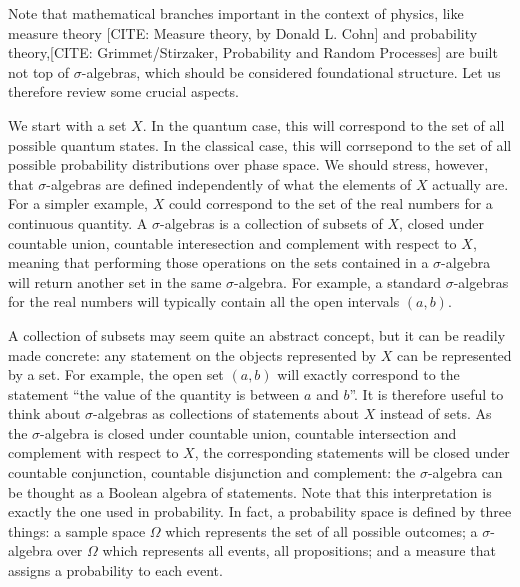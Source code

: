\documentclass[11pt, executivepaper]{article}
\begin{document}


Note that mathematical branches important in the context of physics, like measure theory [CITE: Measure theory, by Donald L. Cohn] and probability theory,[CITE: Grimmet/Stirzaker, Probability and Random Processes] are built not top of $\sigma$-algebras, which should be considered foundational structure. Let us therefore review some crucial aspects.

We start with a set $X$. In the quantum case, this will correspond to the set of all possible quantum states. In the classical case, this will corrsepond to the set of all possible probability distributions over phase space. We should stress, however, that $\sigma$-algebras are defined independently of what the elements of $X$ actually are. For a simpler example, $X$  could correspond to the set of the real numbers for a continuous quantity. A $\sigma$-algebras is a collection of subsets of $X$, closed under countable union, countable interesection and complement with respect to $X$, meaning that performing those operations on the sets contained in a $\sigma$-algebra will return another set in the same $\sigma$-algebra. For example, a standard $\sigma$-algebras for the real numbers will typically contain all the open intervals $(a, b)$.

A collection of subsets may seem quite an abstract concept, but it can be readily made concrete: any statement on the objects represented by $X$ can be represented by a set. For example, the open set $(a, b)$ will exactly correspond to the statement ``the value of the quantity is between $a$ and $b$''. It is therefore useful to think about $\sigma$-algebras as collections of statements about $X$ instead of sets. As the $\sigma$-algebra is closed under countable union, countable intersection and complement with respect to $X$, the corresponding statements will be closed under countable conjunction, countable disjunction and complement: the $\sigma$-algebra can be thought as a Boolean algebra of statements. Note that this interpretation is exactly the one used in probability. In fact, a probability space is defined by three things: a sample space $\Omega$ which represents the set of all possible outcomes; a $\sigma$-algebra over $\Omega$ which represents all events, all propositions; and a measure that assigns a probability to each event.
\end{document}
